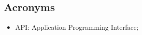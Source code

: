 %
% 
%



\subsection{Acronyms}
\begin{itemize}
\item API: Application Programming Interface;
\end{itemize}

